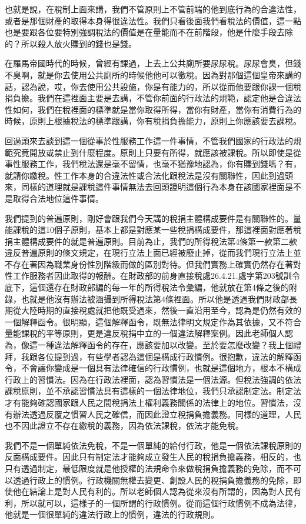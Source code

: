\documentclass[]{ctexbook}
\begin{document}
也就是說，在稅制上面來講，我們不管原則上不管前端的他到底行為的合違法性，或者是那個財產的取得本身得很違法性。我們只看後面我們看稅法的價值，這一點也是要跟各位要特別強調稅法的價值是在量能而不在前階段，他是什麼手段去除的？所以殺人放火賺到的錢也是錢。

在羅馬帝國時代的時候，曾經有課過，上去上公共廁所要尿尿稅。尿尿會臭，但錢不臭啊，就是你去使用公共廁所的時候他他可以徵稅。因為對那個這個皇帝來講的話，認為說，哎，你去使用公共設施，你是有能力的，所以從而他要跟你課一個稅捐負擔。我們在這裡面主要是去講，不管你前面的行政法的規範，認定他是合違法性如何，我們在稅裡面的標準就是當你取得所得，當你有財產，當你有消費行為的時候，原則上根據稅法的標準跟講，你有稅捐負擔能力，原則上你應該要去課稅。

回過頭來去談到這一個從事於性服務工作這一件事情，不管我們國家的行政法的規範究竟開放或禁止到什麼程度。原則上只要有所得，就應該被課稅。所以即使是從事性服務工作，我們稅法還是毫不留情，也毫不猶豫地認為，你有賺到錢嗎？有，就請你繳稅。性工作本身的合違法性或合法化跟稅法是沒有關聯性，因此到過頭來，同樣的道理就是課稅這件事情無法去回頭證明這個行為本身在該國家裡面是不是取得合法地位這件事情。

我們提到的普遍原則，剛好會跟我們今天講的稅捐主體構成要件是有關聯性的。量能課稅的這10個子原則，基本上都是對應某一些稅捐構成要件，那這裡面對應著稅捐主體構成要件的就是普遍原則。目前為止，我們的所得稅法第4條第一款第二款違反普遍原則的條文規定，在現行立法上面已經被廢止掉，從而我們現行立法上並不存在著因為職業身份性別階級而做的區別對待。但我們實務上確實仍然存在著對性工作服務者因此取得的報酬。在財政部的前身直接稅處26.4.21.處字第203號訓令底下，這個還存在財政部編的每一年的所得稅法令彙編，他就放在第4條之後的附錄，也就是他沒有辦法被涵攝到所得稅法第4條裡面。所以他是透過我們財政部長期從大陸時期的直接稅處就把他既受過來，然後一直沿用至今，認為是仍然有效的一個解釋函令。很明顯，這個解釋函令，既無法律明文規定作為其依據，又不符合量能課稅的平等原則，更是違反稅捐中立的一個違法解釋案例。因此老師個人認為，像這一種違法解釋函令的存在，應該要加以改變。至於要怎麼改變？我上個禮拜，我跟各位提到過，有些學者認為這個是構成行政慣例。很抱歉，違法的解釋函令，不會讓你變成是一個具有法律確信的行政慣例，也就是這個地方，根本不構成行政上的習慣法。因為在行政法裡面，認為習慣法是一個法源。但稅法強調的依法課稅原則，並不承認習慣法具有這樣的一個法律地位，我們只承認制定法。制定法才有能夠確認國家跟人民之間稅捐法上權利義務關係的法律上的地位。習慣法，沒有辦法透過反覆之慣習人民之確信，而因此證立稅捐負擔義務。同樣的道理，人民也不因此證立不存在繳稅的義務，因為依法課稅，依法才能免稅。

我們不是一個單純依法免稅，不是一個單純的給付行政，他是一個依法課稅原則的反面構成要件。因此只有制定法才能夠成立發生人民的稅捐負擔義務，相反的，也只有透過制定，最低限度就是他授權的法規命令來做稅捐負擔義務的免除，而不可以透過行政上的慣例。行政機關無權去變更、創設人民的稅捐負擔義務的免除，即使他在結論上是對人民有利的。所以老師個人認為從來沒有所謂的，因為對人民有利，所以就可以，這樣子的一個所謂的行政慣例。從而這個行政慣例不成為法律，他就是一個很單純的違法行政上的慣例，違法的行政規則。
\end{document}
